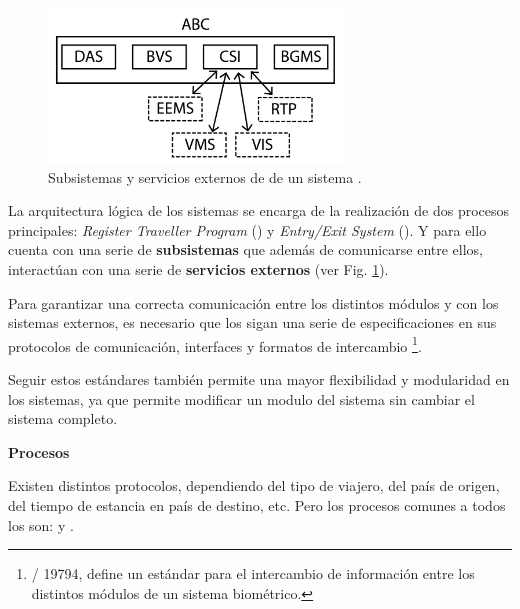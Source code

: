 \begin{figure}
    \centering
    \includegraphics[width=0.7\textwidth]{ch-sistemasABC/images/ch-SistemasABC/SUBSISTEMAS_ABC.png}
    \caption{Subsistemas y servicios externos de de un sistema  \cite{labati2016biometric}.}
    \label{fig:SubsistemasABC}
\end{figure}

La arquitectura lógica de los sistemas se encarga de la realización de dos procesos principales: \textit{Register Traveller Program} (\textbf{}) y \textit{Entry/Exit System} (\textbf{}). Y para ello cuenta con una serie de \textbf{subsistemas} que además de comunicarse entre ellos, interactúan con una serie de \textbf{servicios externos} (ver Fig. \ref{fig:SubsistemasABC}).

Para garantizar una correcta comunicación entre los distintos módulos y con los sistemas externos, es necesario que los  sigan una serie de especificaciones en sus protocolos de comunicación, interfaces y formatos de intercambio \footnote{/ 19794, define un estándar para el intercambio de información entre los distintos módulos de un sistema biométrico.}.
    
Seguir estos estándares también permite una mayor flexibilidad y modularidad en los sistemas, ya que permite modificar un modulo del sistema sin cambiar el sistema completo.

\medskip
\textbf{Procesos}

Existen distintos protocolos, dependiendo del tipo de viajero, del país de origen, del tiempo de estancia en país de destino, etc. Pero los procesos comunes a todos los  son:  y . 

